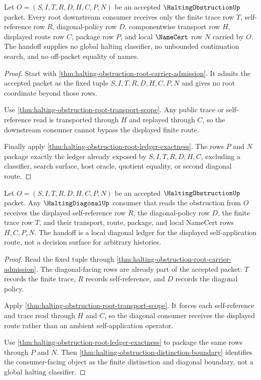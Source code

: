 \begin{theorem}
\label{thm:halting-obstruction-root-consumer-unblock-package}
Let $O=(S,I,T,R,D,H,C,P,N)$ be an accepted $\HaltingObstructionUp$ packet. Every root downstream consumer receives only the finite trace row $T$, self-reference row $R$, diagonal-policy row $D$, componentwise transport row $H$, displayed route row $C$, package row $P$, and local $\NameCert$ row $N$ carried by $O$. The handoff supplies no global halting classifier, no unbounded continuation search, and no off-packet equality of names.
\end{theorem}
\begin{proof}
Start with \autoref{thm:halting-obstruction-root-carrier-admission}. It admits the accepted packet as the fixed tuple $S,I,T,R,D,H,C,P,N$ and gives no root coordinate beyond those rows.

Use \autoref{thm:halting-obstruction-root-transport-scope}. Any public trace or self-reference read is transported through $H$ and replayed through $C$, so the downstream consumer cannot bypass the displayed finite route.

Finally apply \autoref{thm:halting-obstruction-root-ledger-exactness}. The rows $P$ and $N$ package exactly the ledger already exposed by $S,I,T,R,D,H,C$, excluding a classifier, search surface, host oracle, quotient equality, or second diagonal route.
\end{proof}

\begin{theorem}
\label{thm:halting-obstruction-diagonal-consumer-handoff}
Let $O=(S,I,T,R,D,H,C,P,N)$ be an accepted $\HaltingObstructionUp$ packet. Any $\HaltingDiagonalUp$ consumer that reads the obstruction from $O$ receives the displayed self-reference row $R$, the diagonal-policy row $D$, the finite trace row $T$, and their transport, route, package, and local NameCert rows $H,C,P,N$. The handoff is a local diagonal ledger for the displayed self-application route, not a decision surface for arbitrary histories.
\end{theorem}
\begin{proof}
Read the fixed tuple through \autoref{thm:halting-obstruction-root-carrier-admission}. The diagonal-facing rows are already part of the accepted packet: $T$ records the finite trace, $R$ records self-reference, and $D$ records the diagonal policy.

Apply \autoref{thm:halting-obstruction-root-transport-scope}. It forces each self-reference and trace read through $H$ and $C$, so the diagonal consumer receives the displayed route rather than an ambient self-application operator.

Use \autoref{thm:halting-obstruction-root-ledger-exactness} to package the same rows through $P$ and $N$. Then \autoref{thm:halting-obstruction-distinction-boundary} identifies the consumer-facing object as the finite distinction and diagonal boundary, not a global halting classifier.
\end{proof}

